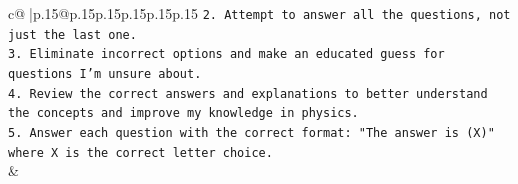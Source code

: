 \documentclass{article}
\begin{document}
{\begin{supertabular}{c@{$\;$}|p{.15\linewidth}@{}p{.15\linewidth}p{.15\linewidth}p{.15\linewidth}p{.15\linewidth}p{.15\linewidth}}
{{{\texttt{2. Attempt to answer all the questions, not just the last one.} \\
\texttt{3. Eliminate incorrect options and make an educated guess for questions I'm unsure about.} \\
\texttt{4. Review the correct answers and explanations to better understand the concepts and improve my knowledge in physics.} \\
\texttt{5. Answer each question with the correct format: "The answer is (X)" where X is the correct letter choice.} \\
            }
        }
    }
    & \\ \\

\end{supertabular}
}
\end{document}
